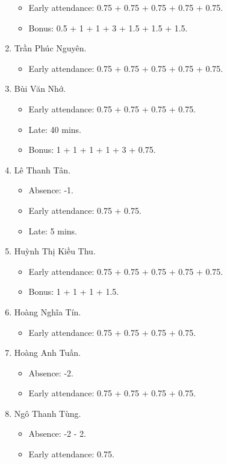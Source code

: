 \documentclass{article}
\begin{document}
\begin{enumerate}
	\begin{itemize}
		\item Early attendance: 0.75 + 0.75 + 0.75 + 0.75 + 0.75.
		\item Bonus: 0.5 + 1 + 1 + 3 + 1.5 + 1.5 + 1.5.
	\end{itemize}
	\item {\sc Trần Phúc Nguyên.}
	\begin{itemize}
		\item Early attendance: 0.75 + 0.75 + 0.75 + 0.75 + 0.75.
	\end{itemize}
	\item {\sc Bùi Văn Nhớ}.
	\begin{itemize}
		\item Early attendance: 0.75 + 0.75 + 0.75 + 0.75.
		\item Late: 40 mins.
		\item Bonus: 1 + 1 + 1 + 1 + 3 + 0.75.	
	\end{itemize}
	\item {\sc Lê Thanh Tân.}
	\begin{itemize}
		\item Absence: -1.
		\item Early attendance: 0.75 + 0.75.
		\item Late: 5 mins.
	\end{itemize}
	\item {\sc Huỳnh Thị Kiều Thu.}
	\begin{itemize}
		\item Early attendance: 0.75 + 0.75 + 0.75 + 0.75 + 0.75.
		\item Bonus: 1 + 1 + 1 + 1.5.
	\end{itemize}
	\item {\sc Hoàng Nghĩa Tín.}
	\begin{itemize}
		\item Early attendance: 0.75 + 0.75 + 0.75 + 0.75.
	\end{itemize}
	\item {\sc Hoàng Anh Tuấn.}
	\begin{itemize}
		\item Absence: -2.
		\item Early attendance: 0.75 + 0.75 + 0.75 + 0.75.
	\end{itemize}
	\item {\sc Ngô Thanh Tùng.}
	\begin{itemize}
		\item Absence: -2 - 2.
		\item Early attendance: 0.75.

\end{itemize}
\end{enumerate}
\end{document}
